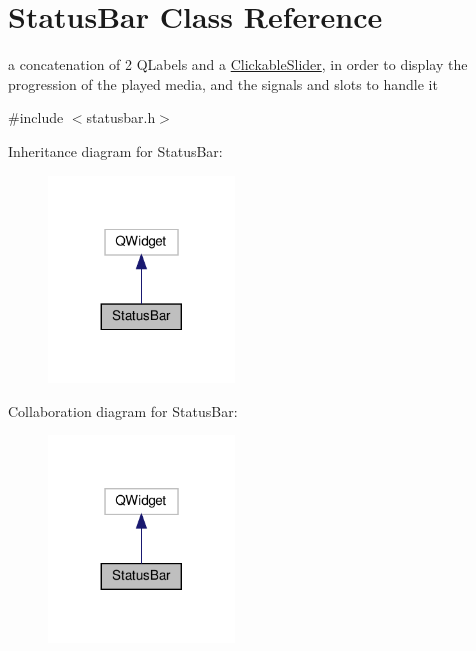 \hypertarget{classStatusBar}{}\section{Status\+Bar Class Reference}
\label{classStatusBar}


a concatenation of 2 Q\+Labels and a \hyperlink{classClickableSlider}{Clickable\+Slider}, in order to display the progression of the played media, and the signals and slots to handle it  




{\ttfamily \#include $<$statusbar.\+h$>$}



Inheritance diagram for Status\+Bar\+:\nopagebreak
\begin{figure}[H]
\begin{center}
\leavevmode
\includegraphics[width=140pt]{classStatusBar__inherit__graph}
\end{center}
\end{figure}


Collaboration diagram for Status\+Bar\+:\nopagebreak
\begin{figure}[H]
\begin{center}
\leavevmode
\includegraphics[width=140pt]{classStatusBar__coll__graph}
\end{center}
\end{figure}
